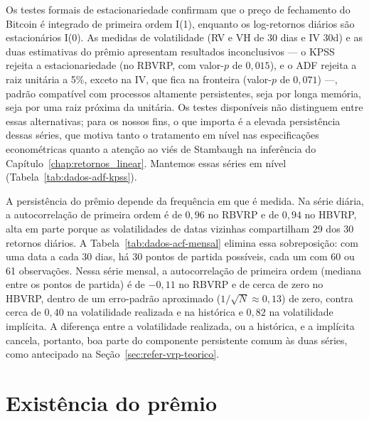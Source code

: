 Os testes formais de estacionariedade confirmam que o preço de fechamento do Bitcoin é integrado de primeira ordem I(1), enquanto os log-retornos diários são estacionários I(0). As medidas de volatilidade (RV e VH de 30 dias e IV 30d) e as duas estimativas do prêmio apresentam resultados inconclusivos --- o KPSS rejeita a estacionariedade (no RBVRP, com valor-$p$ de $0{,}015$), e o ADF rejeita a raiz unitária a 5\%, exceto na IV, que fica na fronteira (valor-$p$ de $0{,}071$) ---, padrão compatível com processos altamente persistentes, seja por longa memória, seja por uma raiz próxima da unitária. Os testes disponíveis não distinguem entre essas alternativas; para os nossos fins, o que importa é a elevada persistência dessas séries, que motiva tanto o tratamento em nível nas especificações econométricas quanto a atenção ao viés de Stambaugh na inferência do Capítulo~\ref{chap:retornos_linear}. Mantemos essas séries em nível (Tabela~\ref{tab:dados-adf-kpss}).


A persistência do prêmio depende da frequência em que é medida. Na série
diária, a autocorrelação de primeira ordem é de $0{,}96$ no RBVRP e de $0{,}94$
no HBVRP, alta em parte porque as volatilidades de datas vizinhas compartilham
29 dos 30 retornos diários. A Tabela~\ref{tab:dados-acf-mensal} elimina essa
sobreposição: com uma data a cada 30 dias, há 30 pontos de partida possíveis,
cada um com 60 ou 61 observações. Nessa série mensal, a autocorrelação de
primeira ordem (mediana entre os pontos de partida) é de $-0{,}11$ no RBVRP e
de cerca de zero no HBVRP, dentro de um erro-padrão aproximado
($1/\sqrt{N} \approx 0{,}13$) de zero, contra cerca de $0{,}40$ na volatilidade
realizada e na histórica e $0{,}82$ na volatilidade implícita. A diferença
entre a volatilidade realizada, ou a histórica, e a implícita cancela,
portanto, boa parte do componente persistente comum às duas séries, como
antecipado na Seção~\ref{sec:refer-vrp-teorico}.


\section{Existência do prêmio}
\label{sec:dados-h1}


